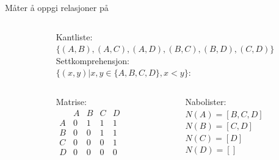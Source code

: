 \begin{frame}[fragile]{Måter å oppgi relasjoner på}
    \begin{columns}
        \begin{column}{0.3\textwidth}
        \end{column}
        \begin{column}{0.65\textwidth}
            \pause
            Kantliste:\\
            $\{(A, B), (A, C), (A, D), (B, C), (B, D), (C, D)\}$\\[5mm]
            \pause
            Settkomprehensjon:\\
            $\{(x, y) | x, y \in \{A,B,C,D\}, x < y\}$:\\[5mm]
            \pause
            \begin{columns}
                \begin{column}{0.27\textwidth}
                    Matrise:\\
                    \begin{math}
                        \begin{matrix}
                              & A & B & C & D\\
                            A & 0 & 1 & 1 & 1\\
                            B & 0 & 0 & 1 & 1\\
                            C & 0 & 0 & 0 & 1\\
                            D & 0 & 0 & 0 & 0
                        \end{matrix}
                    \end{math}
                \end{column}
                \pause
                \begin{column}{0.38\textwidth}
                    Nabolister:\\        
                    $N(A) = [B, C, D]$\\
                    $N(B) = [C, D]$\\
                    $N(C) = [D]$\\
                    $N(D) = []$
                \end{column} 
            \end{columns}
        \end{column}
    \end{columns}
\end{frame}

